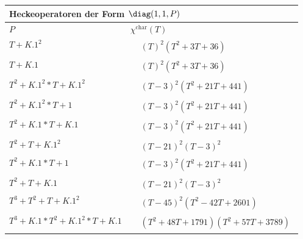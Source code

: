 \begin{tabular}{| l | l |}
\multicolumn{2}{l}{\bf Heckeoperatoren der Form $\diag(1,1,P)$} \\
\hline
$P$ & $\chi^\text{char}(T)$ \\
\hline
$T + K.1^2$ &
$\!\begin{aligned}
	&(T)^{2}(T^{2} + 3T + 36)\end{aligned}$ \\
\hline
$T + K.1$ &
$\!\begin{aligned}
	&(T)^{2}(T^{2} + 3T + 36)\end{aligned}$ \\
\hline
$T^2 + K.1^2*T + K.1^2$ &
$\!\begin{aligned}
	&(T - 3)^{2}(T^{2} + 21T + 441)\end{aligned}$ \\
\hline
$T^2 + K.1^2*T + 1$ &
$\!\begin{aligned}
	&(T - 3)^{2}(T^{2} + 21T + 441)\end{aligned}$ \\
\hline
$T^2 + K.1*T + K.1$ &
$\!\begin{aligned}
	&(T - 3)^{2}(T^{2} + 21T + 441)\end{aligned}$ \\
\hline
$T^2 + T + K.1^2$ &
$\!\begin{aligned}
	&(T - 21)^{2}(T - 3)^{2}\end{aligned}$ \\
\hline
$T^2 + K.1*T + 1$ &
$\!\begin{aligned}
	&(T - 3)^{2}(T^{2} + 21T + 441)\end{aligned}$ \\
\hline
$T^2 + T + K.1$ &
$\!\begin{aligned}
	&(T - 21)^{2}(T - 3)^{2}\end{aligned}$ \\
\hline
$T^3 + T^2 + T + K.1^2$ &
$\!\begin{aligned}
	&(T - 45)^{2}(T^{2} - 42T + 2601)\end{aligned}$ \\
\hline
$T^3 + K.1*T^2 + K.1^2*T + K.1$ &
$\!\begin{aligned}
	&(T^{2} + 48T + 1791)(T^{2} + 57T + 3789)\end{aligned}$ \\
\hline
\end{tabular}


